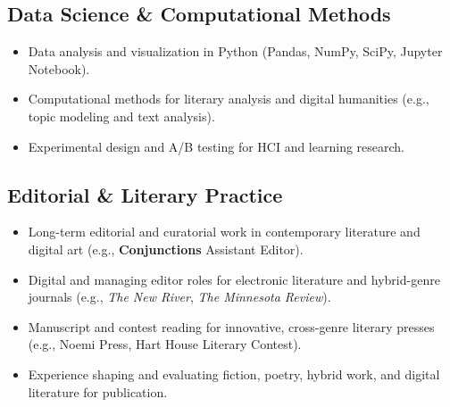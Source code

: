 \subsection{Data Science \& Computational Methods}
\begin{itemize}
  \item Data analysis and visualization in Python (Pandas, NumPy, SciPy, Jupyter Notebook).
  \item Computational methods for literary analysis and digital humanities (e.g., topic modeling and text analysis).
  \item Experimental design and A/B testing for HCI and learning research.
\end{itemize}

\subsection{Editorial \& Literary Practice}
\begin{itemize}
  \item Long-term editorial and curatorial work in contemporary literature and digital art (e.g., \textbf{Conjunctions} Assistant Editor).
  \item Digital and managing editor roles for electronic literature and hybrid-genre journals (e.g., \emph{The New River}, \emph{The Minnesota Review}).
  \item Manuscript and contest reading for innovative, cross-genre literary presses (e.g., Noemi Press, Hart House Literary Contest).
  \item Experience shaping and evaluating fiction, poetry, hybrid work, and digital literature for publication.
\end{itemize}
